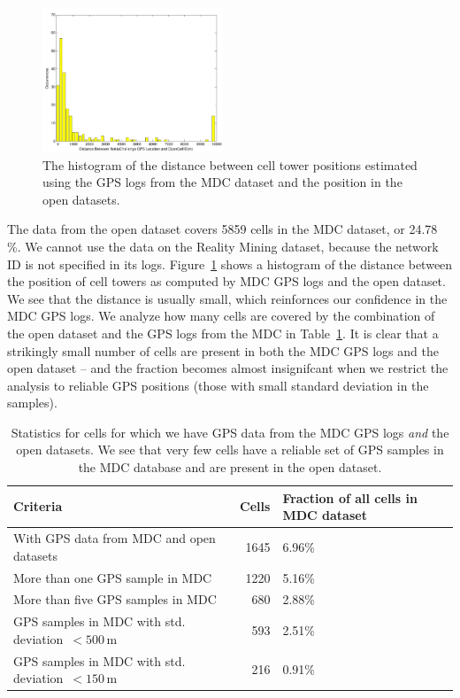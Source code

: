 \documentclass[letterpaper, 12pt, conference]{ieeeconf}
\begin{document}
\begin{figure}
\centering
\includegraphics[width=0.48\textwidth]{figs/mdc_open_distance}
\caption{The histogram of the distance between cell tower positions estimated 
using the GPS logs from the MDC dataset and the position in the open datasets.}
\label{fig:mdc_open_distance}
\end{figure}

The data from the open dataset covers 5859 cells in the MDC dataset, or 24.78
\%. We cannot use the data on the Reality Mining dataset, because the network 
ID is not specified in its logs. Figure~\ref{fig:mdc_open_distance} shows a 
histogram of the distance between the position of cell towers as computed by 
MDC GPS logs and the open dataset. We see that the distance is usually small, 
which reinfornces our confidence in the MDC GPS logs. We analyze how many 
cells are covered by the combination of the open dataset and the GPS logs 
from the MDC in Table~\ref{tbl:open_mdc_stats}. It is clear that a strikingly 
small number of cells are present in both the MDC GPS logs and the open 
dataset -- and the fraction becomes almost insignifcant when we restrict the 
analysis to reliable GPS positions (those with small standard deviation in 
the samples).
\begin{table}
    \centering
    \begin{tabular}{ | m{2.8cm} || r | m{3cm} | }
    \hline
    Criteria & Cells & Fraction of all cells in MDC dataset \\
    \hline
		With GPS data from MDC and open datasets & 1645 & 6.96\%  \\
    \hline
		More than one GPS sample in MDC & 1220 & 5.16\% \\
    \hline
		More than five  GPS samples in MDC & 680 & 2.88\% \\
    \hline
		GPS samples in MDC with  std. deviation~$ < 500$\,m & 593 & 2.51\% \\
    \hline
		GPS samples in MDC with  std. deviation~$ < 150$\,m & 216 & 0.91\% \\
    \hline
    \end{tabular}
\caption{Statistics for cells for which we have GPS data from the MDC GPS 
logs \textit{and} the open datasets. We see that very few cells have a 
reliable set of GPS samples in the MDC database and are present in the open 
dataset. }
\label{tbl:open_mdc_stats}
\end{table}
\end{document}
